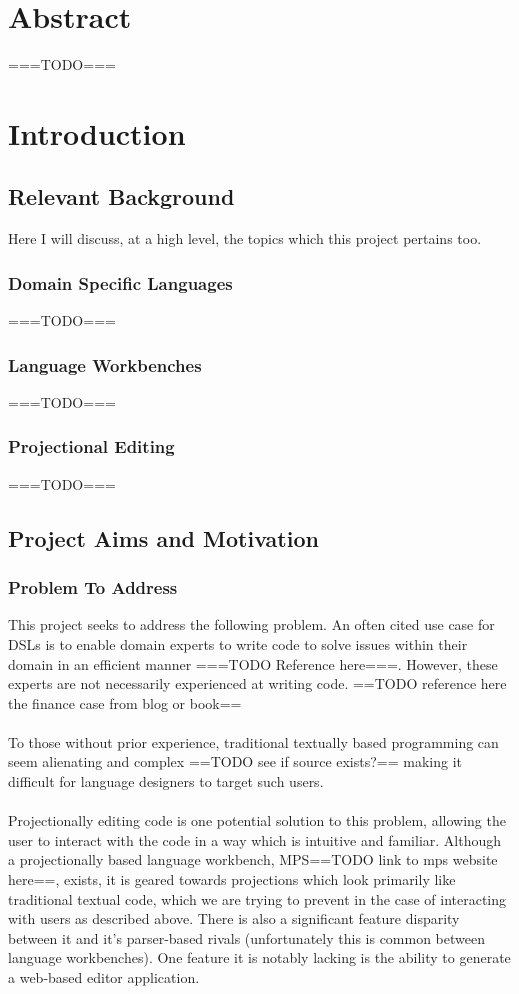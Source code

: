 \documentclass{article}
\begin{document}
%
\section*{Abstract}
===TODO===

\section{Introduction}
\subsection{Relevant Background}
Here I will discuss, at a high level, the topics which this project pertains too.
\subsubsection{Domain Specific Languages}

===TODO===
\subsubsection{Language Workbenches}
===TODO===
\subsubsection{Projectional Editing}
===TODO===
\subsection{Project Aims and Motivation}

\subsubsection{Problem To Address}\label{problem}

This project seeks to address the following problem. An often cited use case for DSLs is to enable domain experts to write code to solve issues within their domain in an efficient manner ===TODO Reference here===. However, these experts are not necessarily experienced at writing code.  ==TODO reference here the finance case from blog or book== \\
\\
To those without prior experience, traditional textually based programming can seem alienating and complex ==TODO see if source exists?== making it difficult for language designers to target such users.
\\
\\
Projectionally editing code is one potential solution to this problem, allowing the user to interact with the code in a way which is intuitive and familiar. Although a projectionally based language workbench, MPS==TODO link to mps website here==, exists, it is geared towards projections which look primarily like traditional textual code, which we are trying to prevent in the case of interacting with users as described above. There is also a significant feature disparity between it and it's parser-based rivals (unfortunately this is common between language workbenches). One feature it is notably lacking is the ability to generate a web-based editor application.
\end{document}
